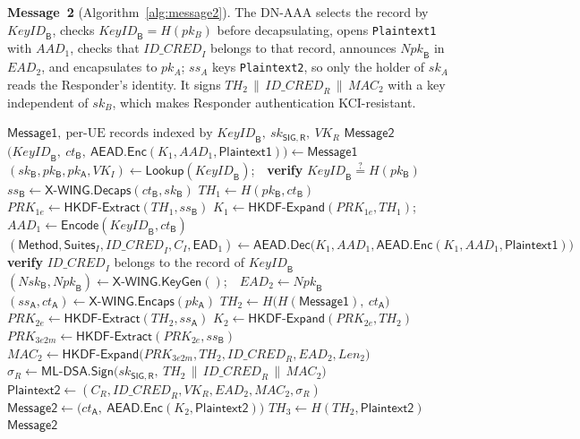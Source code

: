 \documentclass[symmetry,article,submit,moreauthors]{Definitions/mdpi}
\newcommand{\XWING}{\mathsf{X\text{-}WING}}
\begin{document}
\textbf{Message~2} (Algorithm~\ref{alg:message2}). The DN-AAA selects the record by $\mathit{KeyID}_{\mathsf{B}}$, checks $\mathit{KeyID}_{\mathsf{B}} = H(pk_B)$ before decapsulating, opens \texttt{Plaintext1} with $AAD_1$, checks that $\mathit{ID\_CRED}_I$ belongs to that record, announces $\mathit{Npk}_{\mathsf{B}}$ in $\mathit{EAD}_2$, and encapsulates to $pk_A$; $ss_A$ keys \texttt{Plaintext2}, so only the holder of $sk_A$ reads the Responder's identity. It signs $TH_2\,\|\,\mathit{ID\_CRED}_R\,\|\,\mathit{MAC}_2$ with a key independent of $sk_B$, which makes Responder authentication KCI-resistant.

\begin{algorithm}[H]
\caption{EDHOC \texttt{Message2} (DN-AAA $\to$ UE)}
\label{alg:message2}
{\footnotesize
\begin{algorithmic}[1]
\Require $\mathsf{Message1},\ \text{per-UE records indexed by } \mathit{KeyID}_{\mathsf{B}},\ sk_{\mathsf{SIG,R}},\ VK_R$
\Ensure $\mathsf{Message2}$
\State $\big(\mathit{KeyID}_{\mathsf{B}},\ ct_{\mathsf{B}},\ \mathsf{AEAD.Enc}(K_1, AAD_1, \mathsf{Plaintext1})\big) \gets \mathsf{Message1}$
\State $(sk_{\mathsf{B}}, pk_{\mathsf{B}}, pk_{\mathsf{A}}, VK_I) \gets \mathsf{Lookup}(\mathit{KeyID}_{\mathsf{B}})$;\ \ \textbf{verify} $\mathit{KeyID}_{\mathsf{B}} \overset{?}{=} H(pk_{\mathsf{B}})$ 
\State $ss_{\mathsf{B}} \gets \XWING.\mathsf{Decaps}(ct_{\mathsf{B}}, sk_{\mathsf{B}})$
\State $TH_1 \gets H(pk_{\mathsf{B}}, ct_{\mathsf{B}})$
\State $PRK_{1e} \gets \mathsf{HKDF\text{-}Extract}(TH_1, ss_{\mathsf{B}})$
\State $K_1 \gets \mathsf{HKDF\text{-}Expand}(PRK_{1e}, TH_1)$;\ \ $AAD_1 \gets \mathsf{Encode}(\mathit{KeyID}_{\mathsf{B}}, ct_{\mathsf{B}})$
\State $(\mathsf{Method}, \mathsf{Suites}_I, \mathit{ID\_CRED}_I, C_I, \mathsf{EAD}_1) \gets \mathsf{AEAD.Dec}\big(K_1, AAD_1, \mathsf{AEAD.Enc}(K_1, AAD_1, \mathsf{Plaintext1})\big)$
\State \textbf{verify} $\mathit{ID\_CRED}_I$ belongs to the record of $\mathit{KeyID}_{\mathsf{B}}$
\State $(\mathit{Nsk}_{\mathsf{B}}, \mathit{Npk}_{\mathsf{B}}) \gets \XWING.\mathsf{KeyGen}()$;\ \ $\mathit{EAD}_2 \gets \mathit{Npk}_{\mathsf{B}}$ 
\State $(ss_{\mathsf{A}}, ct_{\mathsf{A}}) \gets \XWING.\mathsf{Encaps}(pk_{\mathsf{A}})$
\State $TH_2 \gets H\big(H(\mathsf{Message1}),\ ct_{\mathsf{A}})$
\State $PRK_{2e} \gets \mathsf{HKDF\text{-}Extract}(TH_2, ss_{\mathsf{A}})$
\State $K_2 \gets \mathsf{HKDF\text{-}Expand}(PRK_{2e}, TH_2)$
\State $PRK_{3e2m} \gets \mathsf{HKDF\text{-}Extract}(PRK_{2e}, ss_{\mathsf{B}})$
\State $\mathit{MAC}_2 \gets \mathsf{HKDF\text{-}Expand}\big(PRK_{3e2m}, TH_2, \mathit{ID\_CRED}_R, \mathit{EAD}_2, \mathit{Len}_2\big)$
\State $\sigma_R \gets \mathsf{ML\text{-}DSA.Sign}\big(sk_{\mathsf{SIG,R}},\ TH_2 \,\|\, \mathit{ID\_CRED}_R \,\|\, \mathit{MAC}_2\big)$ 
\State $\mathsf{Plaintext2} \gets (C_R, \mathit{ID\_CRED}_R, VK_R, \mathit{EAD}_2, \mathit{MAC}_2, \sigma_R)$
\State $\mathsf{Message2} \gets \big(ct_{\mathsf{A}},\ \mathsf{AEAD.Enc}(K_2, \mathsf{Plaintext2})\big)$
\State $TH_3 \gets H(TH_2, \mathsf{Plaintext2})$
\State \Return $\mathsf{Message2}$
\end{algorithmic}
}
\end{algorithm}
\end{document}
